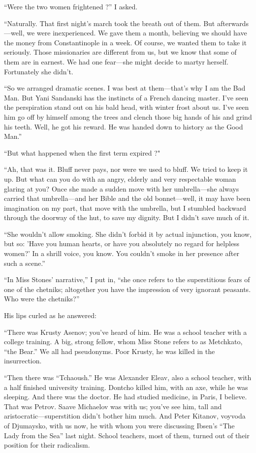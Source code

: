 \documentclass[a5paper,12pt]{book}
\begin{document}
“Were the two women frightened ?” I asked.

“Naturally. That first night's march took the breath out of them. But afterwards—well, we were inexperienced. We gave them a month, believing we should have the money from Constantinople in a week. Of course, we wanted them to take it seriously. Those missionaries are different from us, but we know that some of them are in earnest. We had one fear—she might decide to martyr herself. Fortunately she didn’t.

“So we arranged dramatic scenes. I was best at them—that’s why I am the Bad Man. But Yani Sandanski has the instincts of a French dancing master. I’ve seen the perspiration stand out on his bald head, with winter frost about us. I've seen him go off by himself among the trees and clench those big hands of his and grind his teeth. Well, he got his reward. He was handed down to history as the Good Man.”

“But what happened when the first term expired ?"

“Ah, that was it. Bluff never pays, nor were we used to bluff. We tried to keep it up. But what can you do with an angry, elderly and very respectable woman glaring at you? Once she made a sudden move with her umbrella—she always carried that umbrella—and her Bible and the old bonnet—well, it may have been imagination on my part, that move with the umbrella, but I stumbled backward through the doorway of the hut, to save my dignity. But I didn’t save much of it.

“She wouldn’t allow smoking. She didn’t forbid it by actual injunction, you know, but so: 'Have you human hearts, or have you absolutely no regard for helpless women?’ In a shrill voice, you know. You couldn’t smoke in her presence after such a scene.”

“In Miss Stones’ narrative,” I put in, “she once refers to the superstitious fears of one of the chetniks; altogether you have the impression of very ignorant peasants. Who were the chetniks?”

His lips curled as he answered:

“There was Krusty Asenov; you’ve heard of him. He was a school teacher with a college training. A big, strong fellow, whom Miss Stone refers to as Metchkato, “the Bear.” We all had pseudonyms. Poor Krusty, he was killed in the insurrection.

“Then there was “Tchaoush.” He was Alexander Eleav, also a school teacher, with a half finished university training. Dontcho killed him, with an axe, while he was sleeping. And there was the doctor. He had studied medicine, in Paris, I believe. That was Petrov. Saave Michaelov was with us; you’ve see him, tall and aristocratic—superstition didn’t bother him much. And Peter Kitanov, voyvoda of Djumaysko, with us now, he with whom you were discussing Ibsen’s “The Lady from the Sea” last night. School teachers, most of them, turned out of their position for their radicalism.
\end{document}
